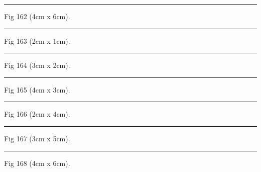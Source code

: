 \documentclass[a4paper,11pt]{article}
\begin{document}
\begin{swarmwrap}%
  \begin{minipage}[t]{4cm}
    \centering
    \rule{\linewidth}{6cm}
    {\footnotesize Fig 162 (4cm x 6cm).}
  \end{minipage}%
\end{swarmwrap}%
\swarmwrapnext
\lipsum[12]%

\begin{swarmwrap}%
  \begin{minipage}[t]{2cm}
    \centering
    \rule{\linewidth}{1cm}
    {\footnotesize Fig 163 (2cm x 1cm).}
  \end{minipage}%
\end{swarmwrap}%
\swarmwrapnext
\lipsum[13]%

\begin{swarmwrap}%
  \begin{minipage}[t]{3cm}
    \centering
    \rule{\linewidth}{2cm}
    {\footnotesize Fig 164 (3cm x 2cm).}
  \end{minipage}%
\end{swarmwrap}%
\swarmwrapnext
\lipsum[14]%

\begin{swarmwrap}%
  \begin{minipage}[t]{4cm}
    \centering
    \rule{\linewidth}{3cm}
    {\footnotesize Fig 165 (4cm x 3cm).}
  \end{minipage}%
\end{swarmwrap}%
\swarmwrapnext
\lipsum[15]%

\begin{swarmwrap}%
  \begin{minipage}[t]{2cm}
    \centering
    \rule{\linewidth}{4cm}
    {\footnotesize Fig 166 (2cm x 4cm).}
  \end{minipage}%
\end{swarmwrap}%
\swarmwrapnext
\lipsum[16]%

\begin{swarmwrap}%
  \begin{minipage}[t]{3cm}
    \centering
    \rule{\linewidth}{5cm}
    {\footnotesize Fig 167 (3cm x 5cm).}
  \end{minipage}%
\end{swarmwrap}%
\swarmwrapnext
\lipsum[17]%

\begin{swarmwrap}%
  \begin{minipage}[t]{4cm}
    \centering
    \rule{\linewidth}{6cm}
    {\footnotesize Fig 168 (4cm x 6cm).}
  \end{minipage}%
\end{swarmwrap}%
\swarmwrapnext
\lipsum[18]%
\end{document}
